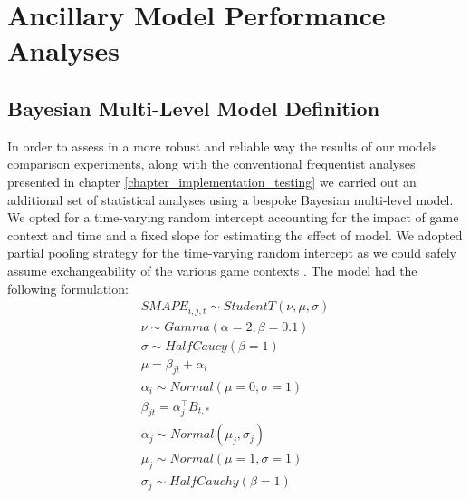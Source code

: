 \chapter{Ancillary Model Performance Analyses}

\section{Bayesian Multi-Level Model Definition}
\label{bayesian_multilevel_model}
In order to assess in a more robust and reliable way the results of our models comparison experiments, along with the conventional frequentist analyses presented in chapter \ref{chapter_implementation_testing} we carried out an additional set of statistical analyses using a bespoke Bayesian multi-level model. We opted for a time-varying random intercept accounting for the impact of game context and time and a fixed slope for estimating the effect of model. We adopted partial pooling strategy for the time-varying random intercept as we could safely assume exchangeability of the various game contexts \cite{gelman2020bayesian}. The model had the following formulation:
\begin{gather}
    \label{bayesian_mlm}
    SMAPE_{i, j, t} \sim StudentT(\nu, \mu, \sigma) \\ \nonumber
    \nu \sim Gamma(\alpha=2, \beta=0.1) \\ \nonumber
    \sigma \sim HalfCaucy(\beta=1)  \\ \nonumber
    \mu = \beta_{jt} + \alpha_{i}  \\ \nonumber
    \alpha_{i} \sim Normal(\mu=0, \sigma=1)  \\ \nonumber
    \beta_{jt} = \alpha_{j}^\top B_{t,*} \\ \nonumber
    \alpha_{j} \sim Normal(\mu_j, \sigma_j) \\ \nonumber
    \mu_j \sim Normal(\mu=1, \sigma=1) \\ \nonumber
    \sigma_j \sim HalfCauchy(\beta=1) \\ \nonumber
\end{gather}
